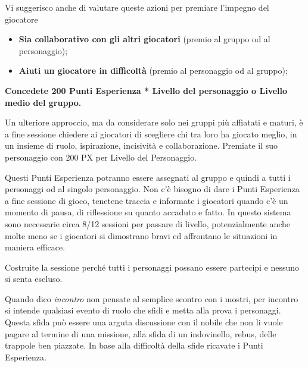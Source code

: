 \begin{multicols}{2}
\medskip

Vi suggerisco anche di valutare queste azioni per premiare l'impegno del giocatore
\begin{itemize}[leftmargin=*] \setlength{\itemsep}{0pt}
\item \textbf{Sia collaborativo con gli altri giocatori} (premio al gruppo od al personaggio);
\item \textbf{Aiuti un giocatore in difficoltà} (premio al personaggio od al gruppo);
\end{itemize}

\medskip

\textbf{Concedete 200 Punti Esperienza * Livello del personaggio o Livello medio del gruppo.}

\medskip


Un ulteriore approccio, ma da considerare solo nei gruppi più affiatati e maturi, è a fine sessione chiedere ai giocatori di scegliere chi tra loro ha giocato meglio, in un insieme di ruolo, ispirazione, incisività e collaborazione. Premiate il suo personaggio con 200 PX per Livello del Personaggio.

Questi Punti Esperienza potranno essere assegnati al gruppo e quindi a tutti i personaggi od al singolo personaggio.
Non c'è bisogno di dare i Punti Esperienza a fine sessione di gioco, tenetene traccia e informate i giocatori quando c'è un momento di pausa, di riflessione su quanto accaduto e fatto.
In questo sistema sono necessarie circa 8/12 sessioni per passare di livello, potenzialmente anche molte meno se i giocatori si dimostrano bravi ed affrontano le situazioni in maniera efficace.

Costruite la sessione perché tutti i personaggi possano essere partecipi e nessuno si senta escluso.



Quando dico \emph{incontro} non pensate al semplice scontro con i mostri, per incontro si intende qualsiasi evento di ruolo che sfidi e metta alla prova i personaggi. Questa sfida può essere una arguta discussione con il nobile che non li vuole pagare al termine di una missione, alla sfida di un indovinello, rebus, delle trappole ben piazzate. In base alla difficoltà della sfide ricavate i Punti Esperienza.


\end{multicols}
